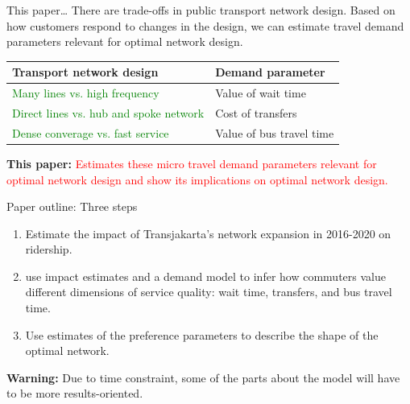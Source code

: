 \documentclass[notes,11pt, aspectratio=169]{beamer}
\begin{document}
\begin{frame}{This paper\ldots}
	There are trade-offs in public transport network design. Based on how customers respond to changes in the design, we can estimate travel demand parameters relevant for optimal network design.

	\begin{table}
		\begin{center}
			\begin{tabular}{l|l}
			\toprule
			\textbf{Transport network design} & \textbf{Demand parameter}\\	
			\hline
			\textcolor{green}{Many lines vs. high frequency} & Value of wait time\\
			\hline
			\textcolor{green}{Direct lines vs. hub and spoke network} & Cost of transfers\\
			\hline
			\textcolor{green}{Dense converage vs. fast service} & Value of bus travel time\\
			\bottomrule
		\end{tabular}
	\end{center}
\end{table}\vspace{2em}

\textbf{This paper:} \textcolor{red}{Estimates these micro travel demand parameters relevant for optimal network design and show its implications on optimal network design.}
\end{frame}

\begin{frame}{Paper outline: Three steps}
	\begin{enumerate}
		\item Estimate the impact of Transjakarta's network expansion in 2016-2020 on ridership.
		\item use impact estimates and a demand model to infer how commuters value different dimensions of service quality: wait time, transfers, and bus travel time.
		\item Use estimates of the preference parameters to describe the shape of the optimal network.
	\end{enumerate}	\vspace{2em}

	\textbf{Warning:} Due to time constraint, some of the parts about the model will have to be more results-oriented.
\end{frame}
\end{document}
